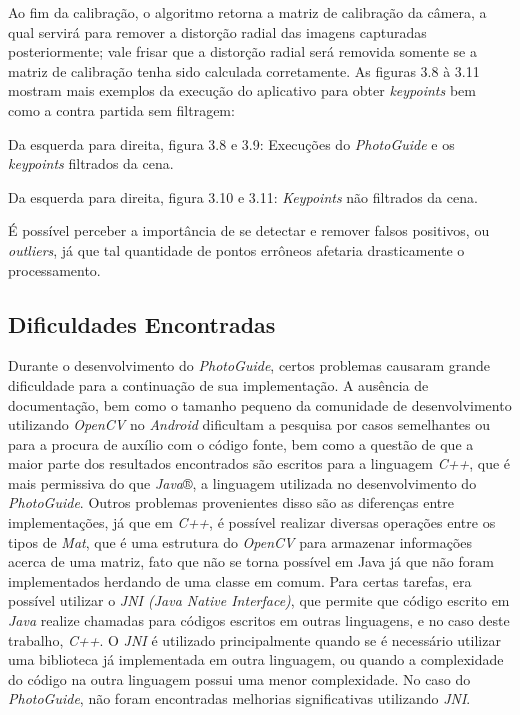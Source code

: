 Ao fim da calibração, o algoritmo retorna a matriz de calibração da câmera, a qual servirá para remover a distorção radial das imagens capturadas posteriormente; vale frisar que a distorção radial será removida somente se  a matriz de calibração tenha sido calculada corretamente. As figuras 3.8 à 3.11 mostram mais exemplos da execução do aplicativo para obter \textit{keypoints} bem como a contra partida sem filtragem:


Da esquerda para direita, figura 3.8 e 3.9: Execuções do \textit{PhotoGuide} e os \textit{keypoints} filtrados da cena.


Da esquerda para direita, figura 3.10 e 3.11: \textit{Keypoints} não filtrados da cena.

É possível perceber a importância de se detectar e remover falsos positivos, ou \textit{outliers}, já que tal quantidade de pontos errôneos afetaria drasticamente o processamento.

\subsection{Dificuldades Encontradas}

Durante o desenvolvimento do \textit{PhotoGuide}, certos problemas causaram grande dificuldade para a continuação de sua implementação. A ausência de documentação, bem como o tamanho pequeno da comunidade de desenvolvimento utilizando \textit{OpenCV} no \textit{Android} dificultam a pesquisa por casos semelhantes ou para a procura de auxílio com o código fonte, bem como a questão de que a maior parte dos resultados encontrados são escritos para a linguagem \textit{C++}, que é mais permissiva do que \textit{Java}®, a linguagem utilizada no desenvolvimento do \textit{PhotoGuide}. Outros problemas provenientes disso são as diferenças entre implementações, já que em \textit{C++}, é possível realizar diversas operações entre os tipos de \textit{Mat},  que é uma estrutura do \textit{OpenCV} para armazenar informações acerca de uma matriz, fato que não se torna possível em Java já que não foram implementados herdando de uma classe em comum. Para certas tarefas, era possível utilizar o \textit{JNI (Java Native Interface)}\cite{JNI}, que permite que código escrito em \textit{Java }realize chamadas para códigos escritos em outras linguagens, e no caso deste trabalho, \textit{C++}. O \textit{JNI} é utilizado principalmente quando se é necessário utilizar uma biblioteca já implementada em outra linguagem, ou quando a complexidade do código na outra linguagem possui uma menor complexidade. No caso do \textit{PhotoGuide}, não foram encontradas melhorias significativas utilizando \textit{JNI}. 

